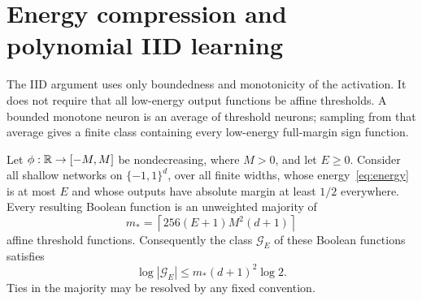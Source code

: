 \section{Energy compression and polynomial IID learning}

The IID argument uses only boundedness and monotonicity of the activation.
It does not require that all low-energy output functions be affine
thresholds. A bounded monotone neuron is an average of threshold neurons;
sampling from that average gives a finite class containing every
low-energy full-margin sign function.

\begin{lemma}\label{lem:compression}
Let $\phi:\mathbb R\to[-M,M]$ be nondecreasing, where $M>0$, and let $E\ge0$.
Consider all shallow networks on $\{-1,1\}^d$, over all finite widths,
whose energy~\eqref{eq:energy} is at most $E$ and whose outputs have
absolute margin at least $1/2$ everywhere. Every resulting Boolean
function is an unweighted majority of
\[
 m_* = \left\lceil256(E+1)M^2(d+1)\right\rceil
\]
affine threshold functions. Consequently the class $\mathcal G_E$ of
these Boolean functions satisfies
\begin{equation}\label{eq:compression-count}
 \log|\mathcal G_E|\le m_*(d+1)^2\log2.
\end{equation}
Ties in the majority may be resolved by any fixed convention.
\end{lemma}
